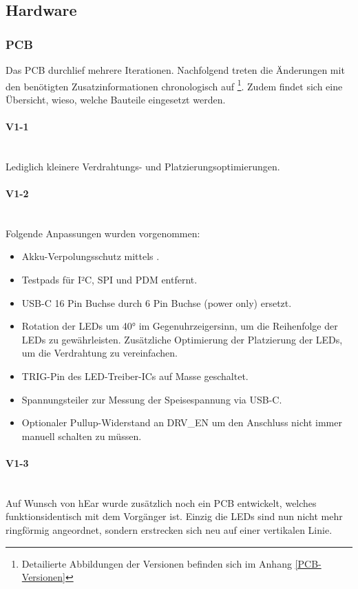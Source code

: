 \documentclass[12pt]{article}
\begin{document}
	\subsection{Hardware}
	\subsubsection{PCB}
	Das PCB durchlief mehrere Iterationen. Nachfolgend treten die Änderungen mit den benötigten Zusatzinformationen chronologisch auf \footnote{Detailierte Abbildungen der Versionen befinden sich im Anhang \ref{PCB-Versionen}}. Zudem findet sich eine Übersicht, wieso, welche Bauteile eingesetzt werden.
	\paragraph{V1-1}\mbox{}\\
	Lediglich kleinere Verdrahtungs- und Platzierungsoptimierungen.
	\paragraph{V1-2}\mbox{}\\
	Folgende Anpassungen wurden vorgenommen:
	\begin{itemize}
		\item Akku-Verpolungsschutz mittels .
		\item Testpads für I²C, SPI und PDM entfernt.
		\item USB-C 16 Pin Buchse durch 6 Pin Buchse (power only) ersetzt.
		\item Rotation der LEDs um 40° im Gegenuhrzeigersinn, um die Reihenfolge der LEDs zu gewährleisten. Zusätzliche Optimierung der Platzierung der LEDs, um die Verdrahtung zu vereinfachen.
		\item TRIG-Pin des LED-Treiber-ICs auf Masse geschaltet.
		\item Spannungsteiler zur Messung der Speisespannung via USB-C.
		\item Optionaler Pullup-Widerstand an DRV\_EN um den Anschluss nicht immer manuell schalten zu müssen.
	\end{itemize}
	\paragraph{V1-3}\mbox{}\\
	Auf Wunsch von hEar wurde zusätzlich noch ein PCB entwickelt, welches funktionsidentisch mit dem Vorgänger ist. Einzig die LEDs sind nun nicht mehr ringförmig angeordnet, sondern erstrecken sich neu auf einer vertikalen Linie.
\end{document}
